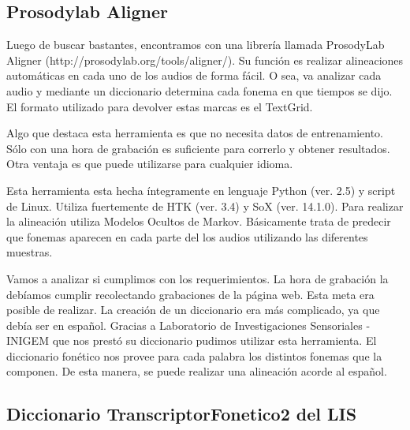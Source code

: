 \documentclass[11pt,a4paper,twoside]{tesis}
\begin{document}
\subsection{Prosodylab Aligner}


Luego de buscar bastantes, encontramos con una librería llamada ProsodyLab Aligner (http://prosodylab.org/tools/aligner/). Su función es realizar alineaciones automáticas en cada uno de los audios de forma fácil. O sea, va analizar cada audio y mediante un diccionario determina cada fonema en que tiempos se dijo. El formato utilizado para devolver estas marcas es el TextGrid. 

Algo que destaca esta herramienta es que no necesita datos de entrenamiento. Sólo con una hora de grabación es suficiente para correrlo y obtener resultados. Otra ventaja es que puede utilizarse para cualquier idioma. 

Esta herramienta esta hecha íntegramente en lenguaje Python (ver. 2.5) y script de Linux. Utiliza fuertemente de HTK (ver. 3.4) y SoX (ver. 14.1.0). Para realizar la alineación utiliza Modelos Ocultos de Markov. Básicamente trata de predecir que fonemas aparecen en cada parte del los audios utilizando las diferentes muestras.


Vamos a analizar si cumplimos con los requerimientos. La hora de grabación la debíamos cumplir recolectando grabaciones de la página web. Esta meta era posible de realizar. La creación de un diccionario era más complicado, ya que debía ser en español. Gracias a Laboratorio de Investigaciones Sensoriales - INIGEM que nos prestó su diccionario pudimos utilizar esta herramienta. El diccionario fonético nos provee para cada palabra los distintos fonemas que la componen. De esta manera, se puede realizar una alineación acorde al español.


\subsection{Diccionario TranscriptorFonetico2 del LIS}
\end{document}
